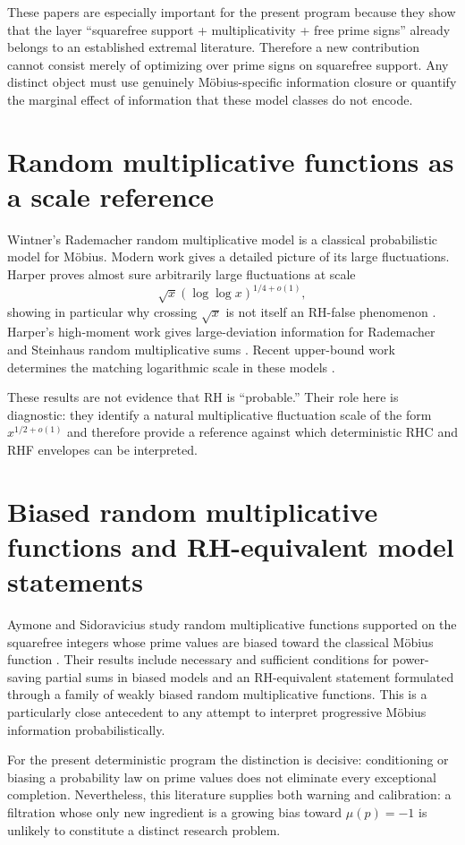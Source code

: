\documentclass[11pt]{article}
\begin{document}
These papers are especially important for the present program because they show that the layer ``squarefree support + multiplicativity + free prime signs'' already belongs to an established extremal literature.  Therefore a new contribution cannot consist merely of optimizing over prime signs on squarefree support.  Any distinct object must use genuinely Möbius-specific information closure or quantify the marginal effect of information that these model classes do not encode.

\section{Random multiplicative functions as a scale reference}
Wintner's Rademacher random multiplicative model is a classical probabilistic model for Möbius.  Modern work gives a detailed picture of its large fluctuations.  Harper proves almost sure arbitrarily large fluctuations at scale
\[
 \sqrt{x}(\log\log x)^{1/4+o(1)},
\]
showing in particular why crossing $\sqrt{x}$ is not itself an RH-false phenomenon \cite{Harper2023}.  Harper's high-moment work gives large-deviation information for Rademacher and Steinhaus random multiplicative sums \cite{Harper2019}.  Recent upper-bound work determines the matching logarithmic scale in these models \cite{DurkanPearceCrump2026}.

These results are not evidence that RH is ``probable.''  Their role here is diagnostic: they identify a natural multiplicative fluctuation scale of the form $x^{1/2+o(1)}$ and therefore provide a reference against which deterministic RHC and RHF envelopes can be interpreted.

\section{Biased random multiplicative functions and RH-equivalent model statements}
Aymone and Sidoravicius study random multiplicative functions supported on the squarefree integers whose prime values are biased toward the classical Möbius function \cite{AymoneSidoravicius2017}.  Their results include necessary and sufficient conditions for power-saving partial sums in biased models and an RH-equivalent statement formulated through a family of weakly biased random multiplicative functions.  This is a particularly close antecedent to any attempt to interpret progressive Möbius information probabilistically.

For the present deterministic program the distinction is decisive: conditioning or biasing a probability law on prime values does not eliminate every exceptional completion.  Nevertheless, this literature supplies both warning and calibration: a filtration whose only new ingredient is a growing bias toward $\mu(p)=-1$ is unlikely to constitute a distinct research problem.
\end{document}
